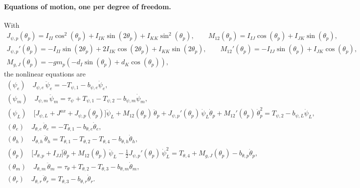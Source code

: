 \documentclass[10pt,a4paper]{article}
\numberwithin{equation}{section}
\begin{document}
\paragraph{Equations of motion, one per degree of freedom.} With
\begin{gather}
J_{\psi,p}(\theta_p) = I_{II} \cos^{2}{\left(\theta_{p} \right)} + I_{IK} \sin{\left(2 \theta_{p} \right)} + I_{KK} \sin^{2}{\left(\theta_{p} \right)},\qquad M_{12}(\theta_p) = I_{IJ} \cos{\left(\theta_{p} \right)} + I_{JK} \sin{\left(\theta_{p} \right)},\\
J_{\psi,p}'(\theta_p) = - I_{II} \sin{\left(2 \theta_{p} \right)} + 2 I_{IK} \cos{\left(2 \theta_{p} \right)} + I_{KK} \sin{\left(2 \theta_{p} \right)},\qquad M_{12}'(\theta_p) = - I_{IJ} \sin{\left(\theta_{p} \right)} + I_{JK} \cos{\left(\theta_{p} \right)},\\
M_{g,J}(\theta_p) = - g m_{p} \left(- d_{I} \sin{\left(\theta_{p} \right)} + d_{K} \cos{\left(\theta_{p} \right)}\right),
\end{gather}
the nonlinear equations are
\begin{gather}
(\psi_e)\quad J_{\psi,e}\,\ddot\psi_e = -T_{\psi,1} - b_{\psi,e}\dot\psi_e, \label{eq:ne_psie}\\
(\psi_m)\quad J_{\psi,m}\,\ddot\psi_m = \tau_\psi + T_{\psi,1} - T_{\psi,2} - b_{\psi,m}\dot\psi_m, \label{eq:ne_psim}\\
(\psi_L)\quad \bigl[J_{\psi,L} + J^{ax} + J_{\psi,p}(\theta_p)\bigr]\ddot\psi_L + M_{12}(\theta_p)\,\ddot\theta_p + J_{\psi,p}'(\theta_p)\,\dot\psi_L\dot\theta_p + M_{12}'(\theta_p)\,\dot\theta_p^2 = T_{\psi,2} - b_{\psi,L}\dot\psi_L, \label{eq:ne_psiL}\\
(\theta_e)\quad J_{\theta,e}\,\ddot\theta_e = -T_{\theta,1} - b_{\theta,e}\dot\theta_e, \label{eq:ne_the}\\
(\theta_h)\quad J_{\theta,h}\,\ddot\theta_h = T_{\theta,1} - T_{\theta,2} - T_{\theta,4} - b_{\theta,h}\dot\theta_h, \label{eq:ne_thh}\\
(\theta_p)\quad \bigl[J_{\theta,p} + I_{JJ}\bigr]\ddot\theta_p + M_{12}(\theta_p)\,\ddot\psi_L - \tfrac12 J_{\psi,p}'(\theta_p)\,\dot\psi_L^2 = T_{\theta,4} + M_{g,J}(\theta_p) - b_{\theta,p}\dot\theta_p, \label{eq:ne_thp}\\
(\theta_m)\quad J_{\theta,m}\,\ddot\theta_m = \tau_\theta + T_{\theta,2} - T_{\theta,3} - b_{\theta,m}\dot\theta_m, \label{eq:ne_thm}\\
(\theta_r)\quad J_{\theta,r}\,\ddot\theta_r = T_{\theta,3} - b_{\theta,r}\dot\theta_r. \label{eq:ne_thr}
\end{gather}
\end{document}
